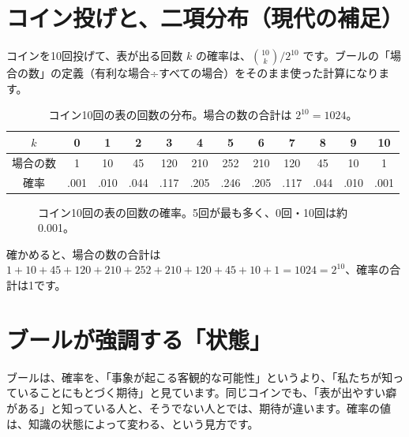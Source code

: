 \documentclass[a4paper,11pt,openany]{ltjsbook}
\begin{document}
\section{コイン投げと、二項分布（現代の補足）}

コインを10回投げて、表が出る回数 $k$ の確率は、$\binom{10}{k}/2^{10}$ です。ブールの「場合の数」の定義（有利な場合÷すべての場合）をそのまま使った計算になります。

\begin{table}[htbp]
\centering
\small
\begin{tabular}{c|ccccccccccc}
\toprule
$k$ & 0 & 1 & 2 & 3 & 4 & 5 & 6 & 7 & 8 & 9 & 10\\
\midrule
場合の数 & 1 & 10 & 45 & 120 & 210 & 252 & 210 & 120 & 45 & 10 & 1\\
確率 & .001 & .010 & .044 & .117 & .205 & .246 & .205 & .117 & .044 & .010 & .001\\
\bottomrule
\end{tabular}
\caption{コイン10回の表の回数の分布。場合の数の合計は $2^{10}=1024$。}
\end{table}

\begin{figure}[htbp]
\centering
{}
\caption{コイン10回の表の回数の確率。5回が最も多く、0回・10回は約0.001。}
\end{figure}

確かめると、場合の数の合計は $1+10+45+120+210+252+210+120+45+10+1=1024=2^{10}$、確率の合計は1です。

\section{ブールが強調する「状態」}

ブールは、確率を、「事象が起こる客観的な可能性」というより、「私たちが知っていることにもとづく期待」と見ています。同じコインでも、「表が出やすい癖がある」と知っている人と、そうでない人とでは、期待が違います。確率の値は、知識の状態によって変わる、という見方です。
\end{document}

